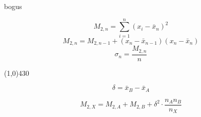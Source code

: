 \documentclass[17pt]{extarticle}
\begin{document}
bogus

\newpage

\begin{equation*}
M_{2,n}\! =\sum_{i=1}^n (x_i - \bar x_n)^2
\end{equation*}
\begin{equation*}
M_{2,n}\! = M_{2,n-1} + (x_n - \bar x_{n-1})(x_n - \bar x_n)
\end{equation*}
\begin{equation*}
\sigma_n = \frac{M_{2,n}}{n}
\end{equation*}

\line(1,0){430}

\begin{equation*}
\delta\! = \bar x_B - \bar x_A
\end{equation*}

\begin{equation*}
M_{2,X} = M_{2,A} + M_{2,B} + \delta^2\cdot\frac{n_A n_B}{n_X}
\end{equation*}
\end{document}
